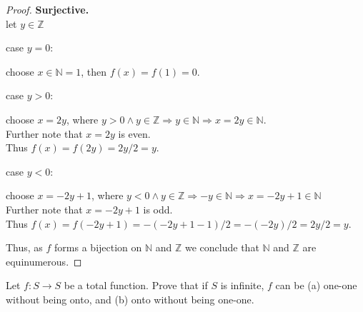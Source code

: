 \documentclass[12pt]{jhwhw}
\begin{document}
\begin{proof}
	\bigbreak
	\textbf{Surjective.} \\
	let $y \in \mathbb{Z}$
	\bigbreak

	case $y = 0$:
	\begin{addmargin}{2em}
		choose $x\in \mathbb{N} = 1$, then $f(x) = f(1) = 0$.
	\end{addmargin}

	case $y > 0$:
	\begin{addmargin}{2em}
		choose $x = 2y$, where $y > 0 \wedge y \in \mathbb{Z} \Rightarrow y \in \mathbb{N} 
		\Rightarrow x = 2y \in \mathbb{N}$. \\
		Further note that $x = 2y$ is even. \\
		Thus $f(x) = f(2y) = 2y/2 = y$. \\
	\end{addmargin}

	case $y < 0$:
	\begin{addmargin}{2em}
		choose $x = -2y+1$, where $y < 0 \wedge y \in \mathbb{Z} \Rightarrow -y \in \mathbb{N}
		\Rightarrow x = -2y+1 \in \mathbb{N}$ \\
		Further note that $x = -2y+1$ is odd. \\
		Thus $f(x) = f(-2y+1) = -(-2y+1-1)/2 = -(-2y)/2 = 2y/2 = y$.
	\end{addmargin}

	\bigbreak
	Thus, as $f$ forms a bijection on $\mathbb{N}$ and $\mathbb{Z}$ we conclude that 
	$\mathbb{N}$ and $\mathbb{Z}$ are equinumerous.
\end{proof}

\problem{}

	Let $f: S \rightarrow S$ be a total function. Prove that if $S$ is infinite, 
	$f$ can be (a) one-one without being onto, and (b) onto without being one-one.

\solution
\end{document}
